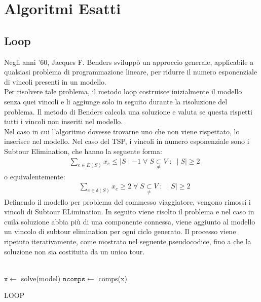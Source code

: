 \section{Algoritmi Esatti}
\subsection{Loop}
Negli anni '60, Jacques F. Benders sviluppò un approccio generale, applicabile a qualsiasi problema di programmazione lineare, per ridurre il numero esponenziale di vincoli presenti in un modello.\\
Per risolvere tale problema, il metodo loop costruisce inizialmente il modello senza quei vincoli e li aggiunge solo in seguito durante la risoluzione del problema. Il metodo di Benders calcola una soluzione e valuta se questa rispetti tutti i vincoli non inseriti nel modello.\\
Nel caso in cui l'algoritmo dovesse trovarne uno che non viene rispettato, lo inserisce nel modello. 
Nel caso del TSP, i vincoli in numero esponenziale sono i Subtour Elimination, che hanno la seguente forma:
\begin{align}
&\underset{e\in E(S)}\sum{x_{e}} \leq \mid S\mid - 1\;\forall\;S\underset{\neq}{\subset}V\; : \; \mid S\mid\geq 2
\end{align}
o equivalentemente:
\begin{align}
&\underset{e\in \delta(S)}\sum{x_{e}}\geq 2\;\forall\;S\underset{\neq}{\subset}V\; : \; \mid S\mid\geq 2
\end{align}
Definendo il modello per problema del commesso viaggiatore, vengono rimossi i vincoli di Subtour ELimination. In seguito viene risolto il problema e nel caso in cuila soluzione abbia più di una componente connessa, viene aggiunto al modello un vincolo di subtour elimination per ogni 
ciclo generato. Il processo viene ripetuto iterativamente, come mostrato nel seguente pseudocodice, fino a che la soluzione non sia costituita da un unico tour.\\\\
\begin{algorithm}[H]
\DontPrintSemicolon
{}
\BlankLine 
 $\mathtt{x} \gets$ solve(model)\;
 $\mathtt{ncomps} \gets$ comps(x)\;
 \BlankLine 
 \caption{LOOP}
\end{algorithm}
